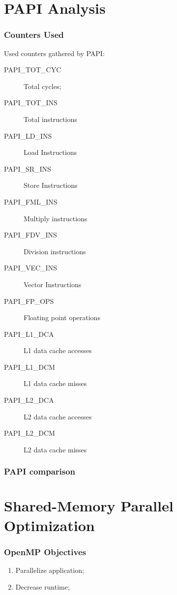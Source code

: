 \documentclass{beamer}
\begin{document}
\section{PAPI Analysis}
\begin{frame}
	\frametitle{Counters Used}

	Used counters gathered by PAPI:
	\begin{description}
		\item[PAPI\_TOT\_CYC] Total cycles;
		\item[PAPI\_TOT\_INS] Total instructions
		\item[PAPI\_LD\_INS] Load Instructions
		\item[PAPI\_SR\_INS] Store Instructions
		\item[PAPI\_FML\_INS] Multiply instructions
		\item[PAPI\_FDV\_INS] Division instructions
		\item[PAPI\_VEC\_INS] Vector Instructions
		\item[PAPI\_FP\_OPS] Floating point operations
		\item[PAPI\_L1\_DCA] L1 data cache accesses
		\item[PAPI\_L1\_DCM] L1 data cache misses
		\item[PAPI\_L2\_DCA] L2 data cache accesses
		\item[PAPI\_L2\_DCM] L2 data cache misses
	\end{description}
\end{frame}

\begin{frame}
	\frametitle{PAPI comparison}
	\begin{figure}[!htp]
	\label{fig:original_papi}
	\end{figure}
	\begin{figure}[!htp]
	\label{fig:optm_papi}
	\end{figure}
\end{frame}


\section{Shared-Memory Parallel Optimization}
\begin{frame}
	\frametitle{OpenMP Objectives}
	\begin{enumerate}
		\item Parallelize application;
		\item Decrease runtime;
	\end{enumerate}
\end{frame}	
\end{document}
